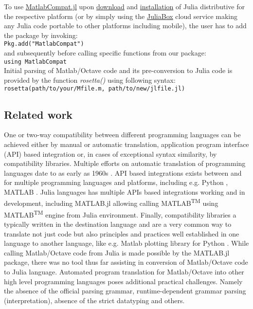 To use \href{https://github.com/MatlabCompat/MatlabCompat.jl}{MatlabCompat.jl} upon \href{http://julialang.org/downloads/}{download} and \href{http://docs.julialang.org/en/release-0.3/manual/getting-started/}{installation} of Julia distributive for the respective platform (or by simply using the \href{https://www.juliabox.org/}{JuliaBox} cloud service making any Julia code portable to other platforms including mobile), the user has to add the package by invoking:\\

\verb|Pkg.add("MatlabCompat")|\\

and subsequently before calling specific functions from our package:\\

\verb|using MatlabCompat|\\

Initial parsing of Matlab/Octave code and its pre-conversion to Julia code is provided by the function \textit{rosetta()} using following syntax:\\

\verb|rosetta(path/to/your/Mfile.m, path/to/new/jlfile.jl)|\\

\subsection{Related work}

One or two-way compatibility between different programming languages can be achieved either by manual or automatic translation, application program interface (API) based integration or, in cases of exceptional syntax similarity, by compatibility libraries. Multiple efforts on automatic translation of programming languages date to as early as 1960s \cite{Ledley_1962, irons1961syntax}. API based integrations exists between and for multiple programming languages and platforms, including e.g. Python \cite{autin2012upy}, MATLAB \cite{Bornstein_2008}. Julia languages has multiple APIs based integrations working and in development, including MATLAB.jl allowing calling MATLAB\textsuperscript{TM} using MATLAB\textsuperscript{TM} engine from Julia environment. Finally, compatibility libraries a typically written in the destination language and are a very common way to translate not just code but also principles and practices well established in one language to another language, like e.g. Matlab plotting library for Python \cite{Hunter_2007, barrett2005matplotlib}. While calling Matlab/Octave code from Julia is made possible by the MATLAB.jl package, there was no tool thus far assisting in conversion of Matlab/Octave 
code to Julia language. Automated program translation for Matlab/Octave into other high level programming languages poses additional practical challenges. Namely the absence of the official parsing grammar, runtime-dependent grammar parsing (interpretation), absence of the strict datatyping and others.

